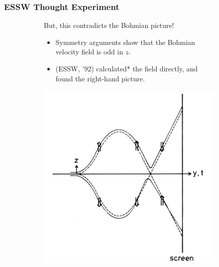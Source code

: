 \documentclass[compress,10pt,usenames,dvipsnames]{beamer}
\theoremstyle{remark}
\begin{document}
\begin{frame}\frametitle{ESSW Thought Experiment}
	\begin{figure}
		\begin{subfigure}[t]{.6\textwidth}
			\vspace*{-1.5in}
			But, this contradicts the Bohmian picture!
			\begin{itemize}
				\item<2-3> Symmetry arguments show that the Bohmian velocity field is odd in $z$.
				\item<3> (ESSW, '92) calculated* the field directly, and found the right-hand picture.
			\end{itemize}
		\end{subfigure}%
		\begin{subfigure}[t]{.4\textwidth}
			\centering
			\includegraphics[scale=0.45]{Figures/fake_fig.png}
		\end{subfigure}
	\end{figure}
\end{frame}
\end{document}
